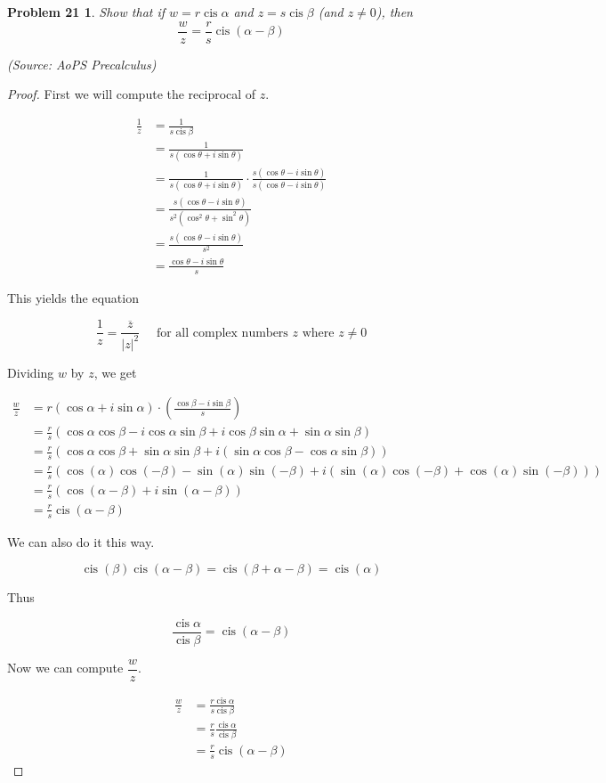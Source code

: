\documentclass{article}
\DeclareMathOperator\cis{cis}
\newtheorem*{theorem}{Problem 21}
\begin{document}
\begin{theorem}
Show that if $w = r \cis \alpha$ and $z = s \cis \beta$ (and $z \neq 0$), then $$\frac{w}{z}= \frac{r}{s} \cis (\alpha - \beta)$$

(Source: AoPS Precalculus)
\end{theorem}

\begin{proof}
First we will compute the reciprocal of $z$.

\begin{align*}
\frac{1}{z} &= \frac{1}{s \cis \beta} \\
&= \frac{1}{s(\cos \theta + i \sin \theta)} \\
&= \frac{1}{s(\cos \theta + i \sin \theta)} \cdot \frac{s(\cos \theta - i \sin \theta)}{s(\cos \theta - i \sin \theta)} \\
&= \frac{s(\cos \theta - i \sin \theta)}{s^2(\cos^2 \theta + \sin^2 \theta)} \\
&= \frac{s(\cos \theta - i \sin \theta)}{s^2} \\
&= \frac{\cos \theta - i \sin \theta}{s}
\end{align*}

This yields the equation

$$ \frac{1}{z} = \frac{\overline{z}}{|z|^2} \quad \text{ for all complex numbers $z$ where } z \neq 0 $$

Dividing $w$ by $z$, we get

\begin{align*}
\frac{w}{z} &= r(\cos \alpha + i \sin \alpha) \cdot \left(\frac{\cos \beta - i \sin \beta}{s}\right) \\
&= \frac{r}{s} (\cos \alpha \cos \beta - i \cos \alpha \sin \beta + i \cos \beta \sin \alpha + \sin \alpha \sin \beta) \\
&= \frac{r}{s} (\cos \alpha \cos \beta + \sin \alpha \sin \beta + i (\sin \alpha \cos \beta - \cos \alpha \sin \beta)) \\
&= \frac{r}{s} (\cos (\alpha) \cos (-\beta) - \sin (\alpha) \sin (-\beta) + i (\sin (\alpha) \cos (-\beta) + \cos (\alpha) \sin (-\beta))) \\
&= \frac{r}{s} (\cos (\alpha - \beta) + i \sin (\alpha - \beta)) \\
&= \boxed{\frac{r}{s} \cis (\alpha - \beta)}
\end{align*}

We can also do it this way.

$$ \cis(\beta) \cis(\alpha - \beta) = \cis(\beta + \alpha - \beta) = \cis(\alpha) $$

Thus

$$ \frac{\cis \alpha}{\cis \beta} = \cis(\alpha - \beta) $$

Now we can compute $\dfrac{w}{z}$.

\begin{align*}
\frac{w}{z} &= \frac{r \cis \alpha}{s \cis \beta} \\
&= \frac{r}{s} \frac{\cis \alpha}{\cis \beta} \\
&= \boxed{\frac{r}{s} \cis(\alpha - \beta)}
\end{align*}
\end{proof}
\end{document}
